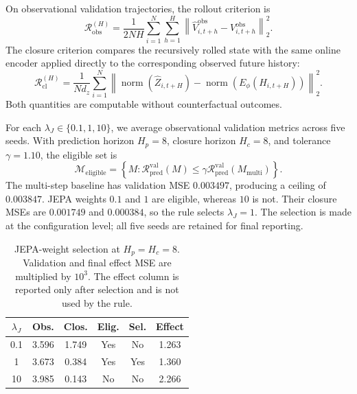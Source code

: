 On observational validation trajectories, the rollout criterion is
\begin{equation}
    \mathcal R_{\mathrm{obs}}^{(H)}
    =\frac{1}{2NH}\sum_{i=1}^{N}\sum_{h=1}^{H}
    \left\|\widehat V_{i,t+h}^{\mathrm{obs}}
    -V_{i,t+h}^{\mathrm{obs}}\right\|_2^2.
\end{equation}
The closure criterion compares the recursively rolled state with the
same online encoder applied directly to the corresponding observed
future history:
\begin{equation}
    \mathcal R_{\mathrm{cl}}^{(H)}
    =\frac{1}{Nd_z}\sum_{i=1}^{N}
    \left\|\operatorname{norm}(\widehat Z_{i,t+H})
    -\operatorname{norm}(E_\phi(H_{i,t+H}))\right\|_2^2.
\end{equation}
Both quantities are computable without counterfactual outcomes.

For each $\lambda_J\in\{0.1,1,10\}$, we average observational validation
metrics across five seeds. With prediction horizon $H_p=8$, closure
horizon $H_c=8$, and tolerance $\gamma=1.10$, the
eligible set is
\begin{equation}
    \mathcal M_{\mathrm{eligible}}
    =\left\{M:
    \mathcal R_{\mathrm{pred}}^{\mathrm{val}}(M)
    \leq
    \gamma\mathcal R_{\mathrm{pred}}^{\mathrm{val}}
    (M_{\mathrm{multi}})
    \right\}.
\end{equation}
The multi-step baseline has validation MSE $0.003497$, producing a
ceiling of $0.003847$. JEPA weights $0.1$ and $1$ are eligible, whereas
$10$ is not. Their closure MSEs are $0.001749$ and $0.000384$, so the
rule selects $\lambda_J=1$. The selection is made at the configuration
level; all five seeds are retained for final reporting.

\begin{table}[t]
\centering
\caption{JEPA-weight selection at $H_p=H_c=8$. Validation and final
effect MSE are multiplied by $10^3$. The effect column is reported only
after selection and is not used by the rule.}
\label{tab:app-lambda-selection}
\scriptsize
\setlength{\tabcolsep}{3pt}
\begin{tabular}{cccccc}
\toprule
$\lambda_J$ & Obs. & Clos. & Elig. & Sel. & Effect \\
\midrule
0.1 & 3.596 & 1.749 & Yes & No  & 1.263 \\
1   & 3.673 & 0.384 & Yes & Yes & 1.360 \\
10  & 3.985 & 0.143 & No  & No  & 2.266 \\
\bottomrule
\end{tabular}
\end{table}

